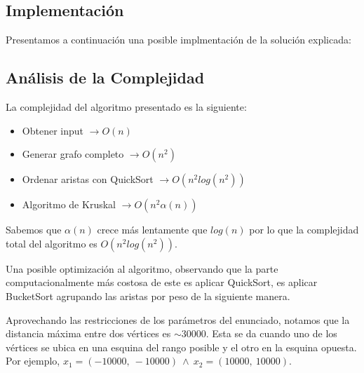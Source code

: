 \vspace{1em}
\subsection{Implementación}
\vspace{1em}

Presentamos a continuación una posible implmentación de la solución explicada:




\subsection{Análisis de la Complejidad}
\vspace{1em}


La complejidad del algoritmo presentado es la siguiente: 

\begin{itemize}
    \item Obtener input \qquad \qquad \qquad \quad $\rightarrow O(n)$
    \item Generar grafo completo \qquad \quad $\rightarrow O(n^2)$
    \item Ordenar aristas con QuickSort $\rightarrow O(n^2 log(n^2))$
    \item Algoritmo de Kruskal \qquad \qquad $\rightarrow O(n^2 \alpha(n))$
\end{itemize}

Sabemos que $\alpha(n)$ crece más lentamente que $log(n)$ por lo que la complejidad total del algoritmo es $O(n^2 log(n^2))$.

\vspace{1em}

Una posible optimización al algoritmo, observando que la parte computacionalmente más costosa de este es aplicar QuickSort, es aplicar BucketSort agrupando las aristas por peso de la siguiente manera.

\vspace{1em}

Aprovechando las restricciones de los parámetros del enunciado, notamos que la distancia máxima entre dos vértices es $\sim30000$. Esta se da cuando uno de los vértices se ubica en una esquina del rango posible y el otro en la esquina opuesta. Por ejemplo, $x_1 = (-10000, \ -10000) \ \wedge \  x_2 = (10000, \ 10000)$.

\vspace{1em}

